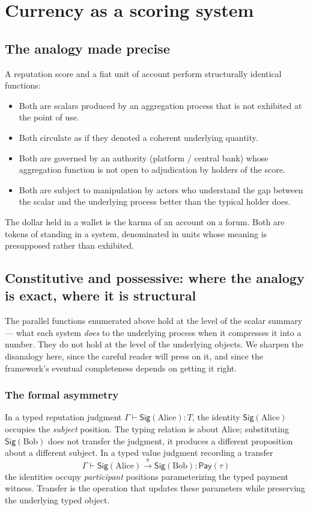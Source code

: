 \documentclass[11pt]{article}
\newcommand{\Sig}{\mathsf{Sig}}
\newcommand{\Pay}{\mathsf{Pay}}
\begin{document}
\section{Currency as a scoring system}

\subsection{The analogy made precise}

A reputation score and a fiat unit of account perform structurally identical functions:
\begin{itemize}[leftmargin=*]
\item Both are scalars produced by an aggregation process that is not exhibited at the point of use.
\item Both circulate as if they denoted a coherent underlying quantity.
\item Both are governed by an authority (platform / central bank) whose aggregation function is not open to adjudication by holders of the score.
\item Both are subject to manipulation by actors who understand the gap between the scalar and the underlying process better than the typical holder does.
\end{itemize}

The dollar held in a wallet is the karma of an account on a forum. Both are tokens of standing in a system, denominated in units whose meaning is presupposed rather than exhibited.

\subsection{Constitutive and possessive: where the analogy is exact, where it is structural}\label{sec:constitutive}

The parallel functions enumerated above hold at the level of the scalar summary --- what each system \emph{does} to the underlying process when it compresses it into a number. They do not hold at the level of the underlying objects. We sharpen the disanalogy here, since the careful reader will press on it, and since the framework's eventual completeness depends on getting it right.

\subsubsection*{The formal asymmetry}

In a typed reputation judgment $\Gamma \vdash \Sig(\text{Alice}) : T$, the identity $\Sig(\text{Alice})$ occupies the \emph{subject} position. The typing relation is about Alice; substituting $\Sig(\text{Bob})$ does not transfer the judgment, it produces a different proposition about a different subject. In a typed value judgment recording a transfer
\[
\Gamma \vdash \Sig(\text{Alice}) \xrightarrow{\pi} \Sig(\text{Bob}) : \Pay(\tau)
\]
the identities occupy \emph{participant} positions parameterizing the typed payment witness. Transfer is the operation that updates these parameters while preserving the underlying typed object.
\end{document}
